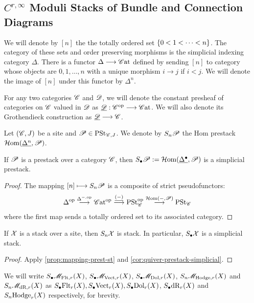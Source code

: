 \documentclass[11pt]{amsart}
\begin{document}
\subsection{$C^{r, \infty}$ Moduli Stacks of Bundle and Connection Diagrams}
\label{subsec:M-Diag-r}

\begin{defn}
We will denote by $[n]$ the the totally ordered set
$\set{0 < 1 < \cdots < n}$. The category of these sets and order preserving morphisms
is the simplicial indexing category $\Delta$.
There is a functor $\Delta \to \Cat$ defined by sending $[n]$ to category whose objects
are $0, 1, \dots, n$ with a unique morphism $i \to j$ if $i < j$.
We will denote the image of $[n]$ under this functor by $\Delta^n$.
\end{defn}

\begin{defn}
For any two categories $\mathscr{C}$ and $\mathscr{D}$, we will denote the constant presheaf of categories
on $\mathscr{C}$ valued in $\mathscr{D}$ as $\ul{\sD} : \sC^\op \to \Cat$.
We will also denote its Grothendieck construction as $\ul\sD \to \sC$.
\end{defn}

\begin{defn}
Let $(\mathscr{C}, J)$ be a site and $\mathscr{P} \in \mathrm{PSt}_{\mathscr{C}, J}$.
We denote by $S_n\mathscr{P}$ the Hom prestack $\mathcal{H}\mathrm{om}(\underline{\Delta^n}, \mathscr{P})$.
\end{defn}

\begin{cor}\label{cor:quiver-prestack-simplicial}
If $\mathscr{P}$ is a prestack over a category $\mathscr{C}$, then
$S_\bullet\mathscr{P} := \mathcal{H}\mathrm{om}(\underline{\Delta^\bullet}, \mathscr{P})$ is a simplicial prestack.
\end{cor}
\begin{proof}
The mapping $[n] \mapsto S_n\sP$ is a composite of strict pseudofunctors:
\[
\Delta^\op \to[\Delta^{-, \op}] \Cat^\op \to[\ul{(-)}] \PSt_\sC^\op \to[\HHom(-, \sP)] \PSt_\sC
\]
where the first map sends a totally ordered set to its associated category.
\end{proof}

\begin{cor}
If $\mathcal{X}$ is a stack over a site, then $S_n\mathcal{X}$ is stack.
In particular, $S_\bullet\mathcal{X}$ is a simplicial stack.
\end{cor}
\begin{proof}
Apply \cref{prop:mapping-prest-st} and \cref{cor:quiver-prestack-simplicial}.
\end{proof}

\begin{notn}
We will write
$S_\bullet\mathscr{M}_{\mathrm{Flt}, r}(X)$, $S_\bullet\mathscr{M}_{\mathrm{Vect}, r}(X)$, $S_\bullet\mathscr{M}_{\mathrm{Dol}, r}(X)$,
$S_n\mathscr{M}_{\mathrm{Hodge}, r}(X)$ and $S_n\mathscr{M}_{\mathrm{dR}, r}(X)$ as
$S_\bullet\mathrm{Flt}_r(X), S_\bullet\mathrm{Vect}_r(X), S_\bullet\mathrm{Dol}_r(X)$, $S_\bullet\mathrm{dR}_r(X)$
and $S_n\mathrm{Hodge}_r(X)$ respectively, for brevity.
\end{notn}
\end{document}
